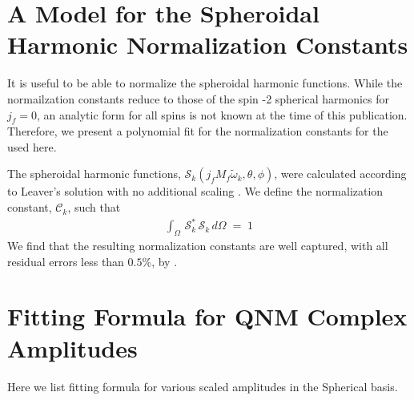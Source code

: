 \documentclass[twocolumn,prd,floatfix,preprintnumbers,a4paper,nofootinbib,superscriptaddress]{revtex4-1}
\newcommand{\cw}{\tilde{\omega}}
\def\j{j_f}
\begin{document}
%
\section{A Model for the Spheroidal Harmonic Normalization Constants}

%
It is useful to be able to normalize the spheroidal harmonic functions.
%
While the normailzation constants reduce to those of the spin -2 spherical harmonics for $\j{}=0$, an analytic form for all spins is not known at the time of this publication.
%
Therefore, we present a polynomial fit for the normalization constants for the \qnm{} used here.
%
\par The spheroidal harmonic functions, $\mathcal{S}_{k}(\j{}M_f\cw{}_k, \theta, \phi)$, were calculated according to Leaver's solution with no additional scaling \cite{Leaver85}.
%
We define the normalization constant, $\mathcal{C}_k$, such that
%
\begin{align}
	\label{eq:slm_norm}
	\int_{\Omega} \, \mathcal{S}^*_k \, \mathcal{S}_k \, d\Omega \; = \; 1
\end{align}
%
We find that the resulting normalization constants are well captured, with all residual errors less than $0.5\%$, by .
%
\begin{widetext}
	
\end{widetext}


%
\section{Fitting Formula for QNM Complex Amplitudes}

Here we list fitting formula for various \pn{} scaled \qnm{} amplitudes in the Spherical basis.
\end{document}
